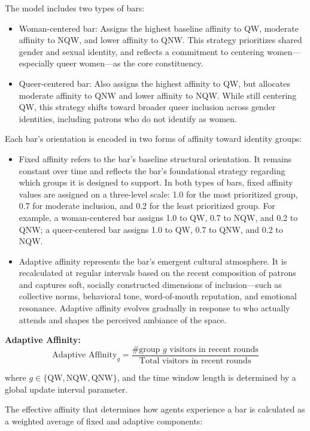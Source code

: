 \documentclass{article}
\begin{document}
The model includes two types of bars:

\begin{itemize}
    \item Woman-centered bar: Assigns the highest baseline affinity to QW, moderate affinity to NQW, and lower affinity to QNW. This strategy prioritizes shared gender and sexual identity, and reflects a commitment to centering women—especially queer women—as the core constituency.
    \item Queer-centered bar: Also assigns the highest affinity to QW, but allocates moderate affinity to QNW and lower affinity to NQW. While still centering QW, this strategy shifts toward broader queer inclusion across gender identities, including patrons who do not identify as women.
\end{itemize}

Each bar's orientation is encoded in two forms of affinity toward identity groups:

\begin{itemize}
    \item Fixed affinity refers to the bar’s baseline structural orientation. It remains constant over time and reflects the bar’s foundational strategy regarding which groups it is designed to support. In both types of bars, fixed affinity values are assigned on a three-level scale: 1.0 for the most prioritized group, 0.7 for moderate inclusion, and 0.2 for the least prioritized group. For example, a woman-centered bar assigns 1.0 to QW, 0.7 to NQW, and 0.2 to QNW; a queer-centered bar assigns 1.0 to QW, 0.7 to QNW, and 0.2 to NQW.
    \item Adaptive affinity represents the bar’s emergent cultural atmosphere. It is recalculated at regular intervals based on the recent composition of patrons and captures soft, socially constructed dimensions of inclusion—such as collective norms, behavioral tone, word-of-mouth reputation, and emotional resonance. Adaptive affinity evolves gradually in response to who actually attends and shapes the perceived ambiance of the space.
\end{itemize}

\textbf{Adaptive Affinity:}
\[
\text{Adaptive Affinity}_g = \frac{\# \text{group } g \text{ visitors in recent rounds}}{\text{Total visitors in recent rounds}}
\]

where $g \in \{\text{QW}, \text{NQW}, \text{QNW}\}$, and the time window length is determined by a global update interval parameter.

The effective affinity that determines how agents experience a bar is calculated as a weighted average of fixed and adaptive components:
\end{document}
